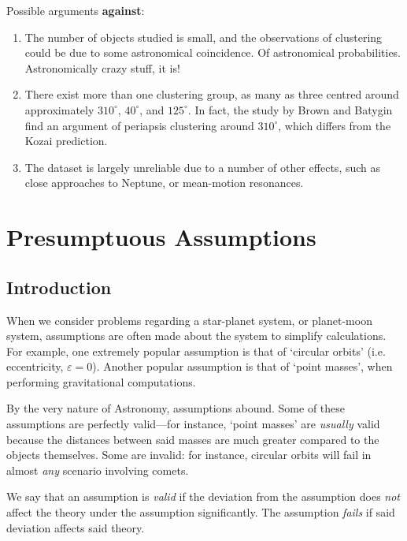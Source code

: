 \documentclass[a4paper,11pt]{exam}
\begin{document}
\begin{questions}
\begin{solution}
		Possible arguments \textbf{against}:
		\begin{enumerate}[leftmargin=13pt]
			\item The number of objects studied is small, and the observations of clustering could be due to some astronomical coincidence. Of astronomical probabilities. Astronomically crazy stuff, it is!
			
			\item There exist more than one clustering group, as many as three centred around approximately $310^\circ$, $40^\circ$, and $125^\circ$. In fact, the study by Brown and Batygin find an argument of periapsis clustering around $310^\circ$, which differs from the Kozai prediction.
			
			\item The dataset is largely unreliable due to a number of other effects, such as close approaches to Neptune, or mean-motion resonances.
		\end{enumerate}
	\end{solution}
\end{questions}

\newpage
\section{Presumptuous Assumptions}
\subsection*{Introduction}
When we consider problems regarding a star-planet system, or planet-moon system, assumptions are often made about the system to simplify calculations. For example, one extremely popular assumption is that of `circular orbits' (i.e. eccentricity, $ \varepsilon = 0 $). Another popular assumption is that of `point masses', when performing gravitational computations.

By the very nature of Astronomy, assumptions abound. Some of these assumptions are perfectly valid---for instance, `point masses' are \textit{usually} valid because the distances between said masses are much greater compared to the objects themselves. Some are invalid: for instance, circular orbits will fail in almost \textit{any} scenario involving comets.

We say that an assumption is \textit{valid} if the deviation from the assumption does \textit{not} affect the theory under the assumption significantly. The assumption \textit{fails} if said deviation affects said theory.
\end{document}
